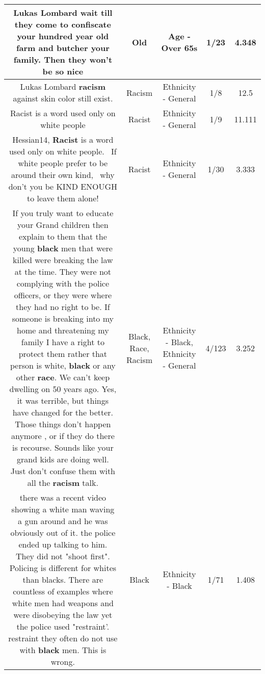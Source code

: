 \documentclass[11pt]{article}
\newlength\mylength
\begin{document}
\begin{center}
\begin{longtable}{|C{.65\mylength}|C{.30\mylength}|C{.12\mylength}|C{.12\mylength}|C{.12\mylength}|}
  \small Lukas Lombard wait till they come to confiscate your hundred year \textbf{old} farm and butcher your family. Then they won't be so nice\normalsize   & Old & Age - Over 65s & 1/23 & 4.348 \\  \hline
  \small Lukas Lombard \textbf{racism} against skin color still exist.\normalsize   & Racism & Ethnicity - General & 1/8 & 12.5 \\  \hline
  \small Racist is a word used only on white people\normalsize   & Racist & Ethnicity - General & 1/9 & 11.111 \\  \hline
  \small Hessian14, \textbf{Racist} is a word used only on white people.  If white people prefer to be around their own kind,  why don't you be KIND ENOUGH to leave them alone!\normalsize   & Racist & Ethnicity - General & 1/30 & 3.333 \\  \hline
  \small If you truly want to educate your Grand children then explain to them that the young \textbf{black} men that were killed were breaking the law at the time. They were not complying with the police officers, or they were where they had no right to be. If someone is breaking into my home and threatening my family I have a right to protect them rather that person is white, \textbf{black} or any other \textbf{race}. We can't keep dwelling on 50 years ago. Yes, it was terrible, but things have changed for the better. Those things don't happen anymore , or if they do there is recourse. Sounds like your grand kids are doing well. Just don't confuse them with all the \textbf{racism} talk.\normalsize   & Black, Race, Racism & Ethnicity - Black, Ethnicity - General & 4/123 & 3.252 \\  \hline
  \small there was a recent video showing a white man waving a gun around and he was obviously out of it. the police ended up talking to him. They did not "shoot first". Policing is different for whites than blacks. There are countless of examples where white men had weapons and were disobeying the law yet the police used "restraint'. restraint they often do not use with \textbf{black} men. This is wrong.\normalsize   & Black & Ethnicity - Black & 1/71 & 1.408 \\  \hline

\end{longtable}
\end{center}
\end{document}
